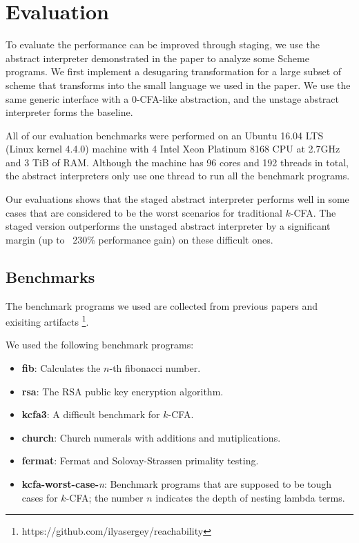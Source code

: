 \section{Evaluation} \label{evaluation}

To evaluate the performance can be improved through staging, we use the abstract
interpreter demonstrated in the paper to analyze some Scheme programs. We first implement
a desugaring transformation for a large subset of scheme that transforms into the
small language we used in the paper.
We use the same generic interface with a 0-CFA-like abstraction, and the unstage abstract
interpreter forms the baseline.

All of our evaluation benchmarks were performed on an Ubuntu 16.04 LTS (Linux kernel 4.4.0)
machine with 4 Intel Xeon Platinum 8168 CPU at 2.7GHz and 3 TiB of RAM.
Although the machine has 96 cores and 192 threads in total,
the abstract interpreters only use one thread to run all the benchmark programs.

Our evaluations shows that the staged abstract interpreter performs well in some
cases that are considered to be the worst scenarios for traditional $k$-CFA.
The staged version outperforms the unstaged abstract interpreter by a significant
margin (up to ~230\% performance gain) on these difficult ones.

\subsection{Benchmarks}
The benchmark programs we used are collected from previous papers \cite{Johnson:2013:OAA:2500365.2500604,
ashley:practical, DBLP:journals/corr/abs-1102-3676} and exisiting artifacts \footnote{https://github.com/ilyasergey/reachability}.

We used the following benchmark programs:
\begin{itemize}
    \item \textbf{fib}: Calculates the $n$-th fibonacci number.
    \item \textbf{rsa}: The RSA public key encryption algorithm.
    \item \textbf{kcfa3}: A difficult benchmark for $k$-CFA.
    \item \textbf{church}: Church numerals with additions and mutiplications.
    \item \textbf{fermat}: Fermat and Solovay-Strassen primality testing.
    \item \textbf{kcfa-worst-case-}\textit{n}: 
      Benchmark programs that are supposed to be tough cases for $k$-CFA; 
      the number $n$ indicates the depth of nesting lambda terms.
\end{itemize}

